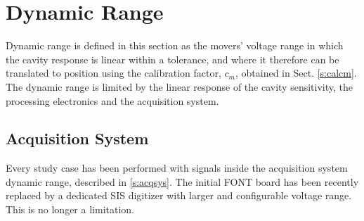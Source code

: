 \section{Dynamic Range}\label{s:dynrange}
Dynamic range is defined in this section as the movers' voltage range in which the cavity response is linear within a tolerance, and where it therefore can be translated to position using the calibration factor, $c_m$, obtained in Sect. \ref{s:calcm}. The dynamic range is limited by the linear response of the cavity sensitivity, the processing electronics and the acquisition system.\par
\subsection{Acquisition System}
Every study case has been performed with signals inside the acquisition system dynamic range, described in \ref{s:acqsys}. The initial FONT board has been recently replaced by a dedicated SIS digitizer with larger and configurable voltage range. This is no longer a limitation.\par
